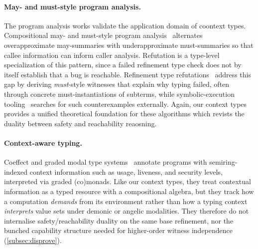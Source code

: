 \paragraph{May- and must-style program analysis.} The program analysis works validate the application domain of coontext types.
Compositional may- and must-style program analysis~\cite{MayMust}
alternates overapproximate may-summaries with underapproximate
must-summaries so that callee information can inform caller analysis.
Refutation is a type-level specialization of this pattern, since a failed
refinement type check does not by itself establish that a bug is
reachable.
Refinement type refutations~\cite{RefinementTypeRefutations} address
this gap by deriving \emph{must}-style witnesses that explain why
typing failed, often through concrete must-instantiations of subterms,
while symbolic-execution tooling~\cite{RefinementTypeSymbolicExecution}
searches for such counterexamples externally.
Again, our context types provides a unified theoretical foundation for these algorithms which revists the duality between safety and reachability reaosning.

\paragraph{Context-aware typing.}
Coeffect and graded modal type systems~\cite{Coeffects,
Katsumata+14, GaboardiCombining, OrchardQuantitative} annotate
programs with semiring-indexed context information such as usage,
liveness, and security levels, interpreted via graded (co)monads.
Like our context types, they treat contextual information as a typed
resource with a compositional algebra, but they track how a
computation \emph{demands} from its environment rather than how a
typing context \emph{interprets} value sets under demonic or angelic
modalities.
They therefore do not internalise safety/reachability duality on the
same base refinement, nor the bunched capability structure needed for
higher-order witness independence (\autoref{subsec:disprove}).